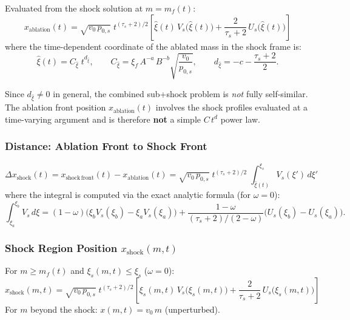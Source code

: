 \documentclass[11pt]{article}
\newcommand{\xsi}{\xi}
\newcommand{\xsif}{\xi_f}
\newcommand{\xsis}{\xi_s}
\begin{document}
Evaluated from the shock solution at $m = m_f(t)$:
\begin{equation}
  \boxed{x_{\mathrm{ablation}}(t) = \sqrt{v_0\,p_{0,s}}\;t^{(\tau_s+2)/2}
  \left[\hat{\xsi}(t)\,V_s\!\bigl(\hat{\xsi}(t)\bigr) + \frac{2}{\tau_s+2}\,U_s\!\bigl(\hat{\xsi}(t)\bigr)\right]}
\end{equation}
where the time-dependent coordinate of the ablated mass in the shock frame is:
\begin{equation}
  \hat{\xsi}(t) = C_{\hat{\xsi}}\;t^{d_{\hat{\xsi}}}, \qquad
  C_{\hat{\xsi}} = \xsif\,A^{-a}\,B^{-b}\sqrt{\frac{v_0}{p_{0,s}}}, \qquad
  d_{\hat{\xsi}} = -c - \frac{\tau_s+2}{2}.
\end{equation}

\begin{notebox}
Since $d_{\hat{\xsi}} \neq 0$ in general, the combined sub+shock problem is \emph{not} fully self-similar. The ablation front position $x_{\mathrm{ablation}}(t)$ involves the shock profiles evaluated at a time-varying argument and is therefore \textbf{not} a simple $C\,t^d$ power law.
\end{notebox}

\subsubsection{Distance: Ablation Front to Shock Front}

\begin{equation}
  \boxed{\Delta x_{\mathrm{shock}}(t) = x_{\mathrm{shock\,front}}(t) - x_{\mathrm{ablation}}(t)
  = \sqrt{v_0\,p_{0,s}}\;t^{(\tau_s+2)/2}\;\int_{\hat{\xsi}(t)}^{\xsis} V_s(\xsi')\,d\xsi'}
\end{equation}
where the integral is computed via the exact analytic formula (for $\omega = 0$):
\begin{equation}
  \int_{\xsi_a}^{\xsi_b} V_s\,d\xsi = (1-\omega)\bigl(\xsi_b V_s(\xsi_b) - \xsi_a V_s(\xsi_a)\bigr) + \frac{1-\omega}{(\tau_s+2)/(2-\omega)}\bigl(U_s(\xsi_b) - U_s(\xsi_a)\bigr).
\end{equation}

\subsubsection{Shock Region Position $x_{\mathrm{shock}}(m,t)$}

For $m \geq m_f(t)$ and $\xsi_s(m,t) \leq \xsis$ ($\omega = 0$):
\begin{equation}
  \boxed{x_{\mathrm{shock}}(m,t) = \sqrt{v_0\,p_{0,s}}\;t^{(\tau_s+2)/2}
  \left[\xsi_s(m,t)\,V_s\!\bigl(\xsi_s(m,t)\bigr) + \frac{2}{\tau_s+2}\,U_s\!\bigl(\xsi_s(m,t)\bigr)\right]}
\end{equation}
For $m$ beyond the shock: $x(m,t) = v_0\,m$ (unperturbed).
\end{document}
